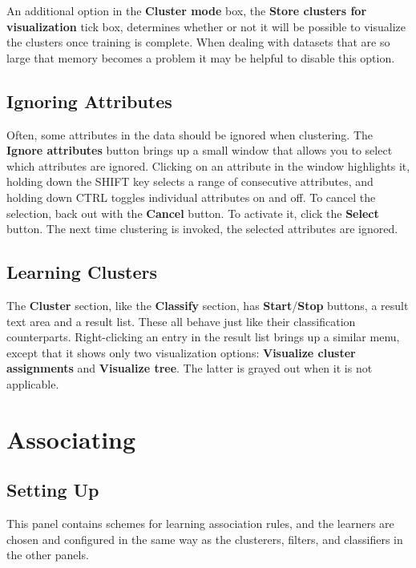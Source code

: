 \documentclass[a4paper]{article}
\begin{document}
An additional option in the \textbf{Cluster mode} box, the \textbf{Store
clusters for visualization} tick box, determines whether or not it will be
possible to visualize the clusters once training is complete. When dealing
with datasets that are so large that memory becomes a problem it may be
helpful to disable this option.

\subsection{Ignoring Attributes}

Often, some attributes in the data should be ignored when clustering.  The
\textbf{Ignore attributes} button brings up a small window that allows you to
select which attributes are ignored.  Clicking on an attribute in the window
highlights it, holding down the SHIFT key selects a range of consecutive
attributes, and holding down CTRL toggles individual attributes on and off. To
cancel the selection, back out with the \textbf{Cancel} button. To activate it,
click the \textbf{Select} button. The next time clustering is invoked, the
selected attributes are ignored.

\subsection{Learning Clusters}

The \textbf{Cluster} section, like the \textbf{Classify} section, has
\textbf{Start}/\textbf{Stop} buttons, a result text area and a result
list. These all behave just like their classification counterparts.
Right-clicking an entry in the result list brings up a similar menu,
except that it shows only two visualization options: \textbf{Visualize
cluster assignments} and \textbf{Visualize tree}. The latter is grayed
out when it is not applicable.

\section{Associating}

\subsection{Setting Up}

This panel contains schemes for learning association rules, and the
learners are chosen and configured in the same way as the clusterers,
filters, and classifiers in the other panels.
\end{document}
